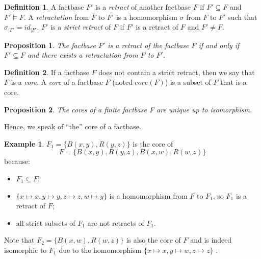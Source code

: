 \documentclass{article}
\newtheorem{proposition}{Proposition}[section]
\theoremstyle{definition}
\newtheorem{definition}{Definition}[section]
\newtheorem{example}{Example}[section]
\theoremstyle{remark}
\begin{document}
\begin{definition}
A factbase $F'$ is a \emph{retract} of another factbase $F$ if $F' \subseteq F$ and $F' \models F$. A \emph{retractation} from $F$ to $F'$ is a homomorphism $\sigma$ from $F$ to $F'$ such that $\sigma_{|F'}=id_{|F'}$. $F'$ is a \emph{strict retract} of $F$ if $F'$ is a retract of $F$ and $F' \neq F$.
\end{definition}


\begin{proposition} \label{retract}
The factbase $F'$ is a retract of the factbase $F$ if and only if $F' \subseteq F$  and there exists a retractation from $F$ to $F'$.
\end{proposition}

\begin{definition}
If a factbase $F$ does not contain a strict retract, then we say that $F$ is a \emph{core}. A \emph{core} of a factbase $F$ (noted \emph{$\textit{core}(F)$}) is a subset of $F$ that is a core.
\end{definition}

\begin{proposition}
The cores of a finite factbase F are unique up to isomorphism.
\end{proposition}

Hence, we speak of ``the'' core of a factbase.

\begin{example}
$F_1 = \{B(x,y),R(y,z)\}$ is the core of $$F = \{B(x,y),R(y,z),B(x,w),R(w,z)\}$$ because:
\begin{itemize}
\item $F_1 \subseteq F$;
\item $\{x \mapsto x, y \mapsto y, z \mapsto z, w \mapsto y\}$ is a homomorphism from $F$ to $F_1$, so $F_1$ is a retract of $F$;
\item all strict subsets of $F_1$ are not retracts of $F_1$.
\end{itemize}
Note that $F_2 = \{B(x,w),R(w,z)\}$ is also the core of $F$ and is indeed isomorphic to $F_1$ due to the homomorphism $\{x \mapsto x, y \mapsto w, z \mapsto z\}$ .
\end{example}

\end{document}
